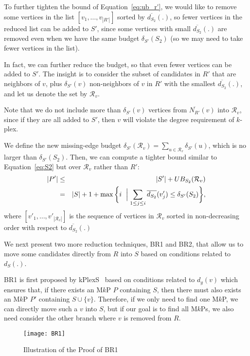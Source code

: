 \documentclass[sigconf, nonacm]{acmart}
\begin{document}
To further tighten the bound of Equation~\eqref{eq:ub_r'}, we would like to remove some vertices in the list $[v_1,\ldots, v_{|R'|}]$ sorted by $\overline{d_{S_2}}(.)$, so fewer vertices in the reduced list can be added to $S'$, since some vertices with small $\overline{d_{S_2}}(.)$ are removed even when we have the same budget $\delta_{S'}(S_2)$ (so we may need to take fewer vertices in the list).

In fact, we can further reduce the budget, so that even fewer vertices can be added to $S'$. The insight is to consider the subset of candidates in $R'$ that are neighbors of $v$, plus $\delta_{S'}(v)$ non-neighbors of $v$ in $R'$ with the smallest $\overline{d_{S_2}}(.)$, and let us denote the set by $\mathcal{R}_v$. 

Note that we do not include more than $\delta_{S'}(v)$ vertices from $\overline{N_{R'}}(v)$ into $\mathcal{R}_v$, since if they are all added to $S'$, then $v$ will violate the degree requirement of $k$-plex.

We define the new missing-edge budget $\delta_{S'}(\mathcal{R}_v)=\sum_{u\in \mathcal{R}_v}{\delta_{S'}(u)}$, which is no larger than $\delta_{S'}(S_2)$. Then, we can compute a tighter bound similar to Equation~\eqref{eq:S2} but over $\mathcal{R}_v$ rather than $R'$:
\begin{eqnarray}
  |P'| & \le & |S'| + UB_{S_2}(\mathcal{R}_v)\nonumber\\
  & = & |S| + 1 +\max\bigg\{i\ \Bigm| \sum_{1\le j\le i}\overline{d_{S_2}}(v'_j)\le \delta_{S'}(S_2)\bigg\},
\end{eqnarray}
where $[v'_1,\ldots, v'_{|\mathcal{R}_v|}]$ is the sequence of vertices in $\mathcal{R}_v$ sorted in non-decreasing order with respect to $\overline{d_{S_2}}(.)$

\vspace{2mm}
We next present two more reduction techniques, BR1 and BR2, that allow us to move some candidates directly from $R$ into $S$ based on conditions related to $d_S(.)$.

BR1 is first proposed by kPlexS~\cite{kPlexS} based on conditions related to $d_g(v)$ which ensures that, if there exists an M$k$P $P$ containing $S$, then there must also exists an M$k$P $P'$ containing $S\cup\{v\}$. Therefore, if we only need to find one M$k$P, we can directly move such a $v$ into $S$, but if our goal is to find all M$k$Ps, we also need consider the other branch where $v$ is removed from $R$. 

\begin{figure}[t]
  \texttt{[image: BR1]}
  \caption{Illustration of the Proof of BR1}\label{fig:BR1}
   \vspace{3mm}
\end{figure}
\end{document}
